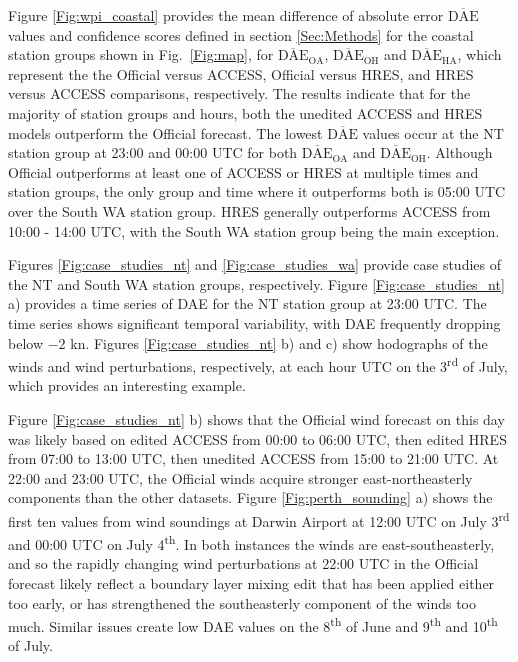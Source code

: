 \documentclass[twocol]{ametsoc}
\begin{document}
Figure \ref{Fig:wpi_coastal} provides the mean difference of absolute error $\overline{\text{DAE}}$ values and confidence scores defined in section \ref{Sec:Methods} for the coastal station groups shown in Fig.~\ref{Fig:map}, for $\overline{\text{DAE}}_\text{OA}$, $\overline{\text{DAE}}_\text{OH}$ and $\overline{\text{DAE}}_\text{HA}$, which represent the the Official versus ACCESS, Official versus HRES, and HRES versus ACCESS comparisons, respectively. The results indicate that for the majority of station groups and hours, both the unedited ACCESS and HRES models outperform the Official forecast. The lowest $\overline{\text{DAE}}$ values occur at the NT station group at 23:00 and 00:00 UTC for both $\overline{\text{DAE}}_\text{OA}$ and $\overline{\text{DAE}}_\text{OH}$. Although Official outperforms at least one of ACCESS or HRES at multiple times and station groups, the only group and time where it outperforms both is 05:00 UTC over the South WA station group. HRES generally outperforms ACCESS from 10:00 - 14:00 UTC, with the South WA station group being the main exception.    

Figures \ref{Fig:case_studies_nt} and \ref{Fig:case_studies_wa} provide case studies of the NT and South WA station groups, respectively. Figure \ref{Fig:case_studies_nt} a) provides a time series of DAE for the NT station group at 23:00 UTC. The time series shows significant temporal variability, with DAE frequently dropping below $-2$ kn. Figures \ref{Fig:case_studies_nt} b) and c) show hodographs of the winds and wind perturbations, respectively, at each hour UTC on the 3\textsuperscript{rd} of July, which provides an interesting example. 

Figure \ref{Fig:case_studies_nt} b) shows that the Official wind forecast on this day was likely based on edited ACCESS from 00:00 to 06:00 UTC, then edited HRES from 07:00 to 13:00 UTC, then unedited ACCESS from 15:00 to 21:00 UTC. At 22:00 and 23:00 UTC, the Official winds acquire stronger east-northeasterly components than the other datasets. Figure \ref{Fig:perth_sounding} a) shows the first ten values from wind soundings at Darwin Airport at 12:00 UTC on July 3\textsuperscript{rd} and 00:00 UTC on July 4\textsuperscript{th}. In both instances the winds are east-southeasterly, and so the rapidly changing wind perturbations at 22:00 UTC in the Official forecast likely reflect a boundary layer mixing edit that has been applied either too early, or has strengthened the southeasterly component of the winds too much. Similar issues create low DAE values on the 8\textsuperscript{th} of June and 9\textsuperscript{th} and 10\textsuperscript{th} of July.
\end{document}
